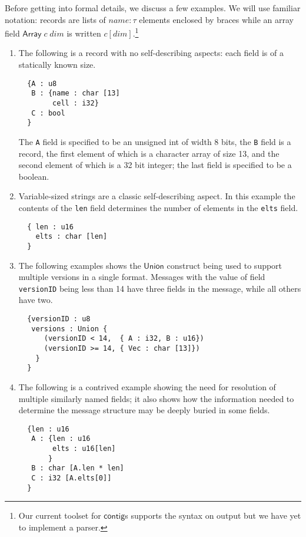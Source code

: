 \documentclass[svgnames]{llncs}
\newcommand{\konst}[1]{\ensuremath{\mathsf{#1}}}
\begin{document}
Before getting into formal details, we discuss a few examples.  We
will use familiar notation: records are lists of $\mathit{name} :
\tau$ elements enclosed by braces while an array field
$\konst{Array}\;c\;\mathit{dim}$ is written
$c [\mathit{dim}]$.\footnote{Our current toolset for \konst{contig}s supports
the syntax on output but we have yet to implement a parser.}

\begin{enumerate}

\item The following is a record with no self-describing aspects: each
  field is of a statically known size.

\begin{verbatim}
  {A : u8
   B : {name : char [13]
        cell : i32}
   C : bool
  }
\end{verbatim}

The \verb+A+ field is specified to be an unsigned int of width 8 bits,
the \verb+B+ field is a record, the first element of which is a
character array of size 13, and the second element of which is a 32
bit integer; the last field is specified to be a
boolean.

\item Variable-sized strings are a classic self-describing aspect. In
  this example the contents of the \verb+len+ field determines the
  number of elements in the \verb+elts+ field.

\begin{verbatim}
  { len : u16
    elts : char [len]
  }
\end{verbatim}


\item The following examples shows the \konst{Union} construct being
  used to support multiple versions in a single format.  Messages with
  the value of field \verb+versionID+ being less than 14 have three
  fields in the message, while all others have two.

\begin{verbatim}
  {versionID : u8
   versions : Union {
      (versionID < 14,  { A : i32, B : u16})
      (versionID >= 14, { Vec : char [13]})
    }
  }
\end{verbatim}

\item The following is a contrived example showing the need for
  resolution of multiple similarly named fields; it also shows how the
  information needed to determine the message structure may be deeply
  buried in some fields.

\begin{verbatim}
  {len : u16
   A : {len : u16
        elts : u16[len]
       }
   B : char [A.len * len]
   C : i32 [A.elts[0]]
  }
\end{verbatim}

\end{enumerate}
\end{document}
